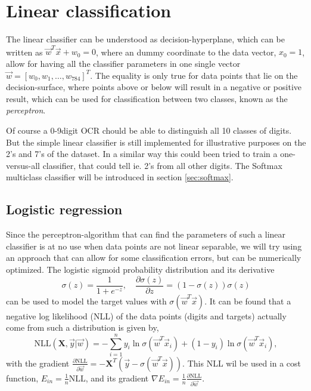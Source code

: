 \documentclass[a4paper,10pt,article,oneside,english]{memoir}
\begin{document}
\chapter{Linear classification}
The linear classifier can be understood as decision-hyperplane, which can be written as $\vec{w}^T \vec{x} + w_0= 0$, where an dummy coordinate to the data vector, $x_0=1$, allow for having all the classifier parameters in one single vector $\vec{w} = [w_0, w_1, \dots, w_{784}]^T$. The equality is only true for data points that lie on the decision-surface, where points above or below will result in a negative or positive result, which can be used for classification between two classes, known as the \emph{perceptron}. 

Of course a 0-9digit OCR chould be able to distinguish all 10 classes of digits. But the simple linear classifier is still implemented for illustrative purposes on the 2's and 7's of the dataset. In a similar way this could been tried to train a one-versus-all classifier, that could tell ie. 2's from all other digits. The Softmax multiclass classifier will be introduced in section \ref{sec:softmax}.
\section{Logistic regression}
Since the perceptron-algorithm that can find the parameters of such a linear classifier is at no use when data points are not linear separable, we will try using an approach that can allow for some classification errors, but can be numerically optimized. The logistic sigmoid probability distribution and its derivative 
\begin{equation*}
\sigma(z) = \frac{1}{1+ e^{-z}}, \quad \frac{\partial \sigma(z)}{\partial z} = (1 - \sigma(z))\sigma(z)
\end{equation*}
can be used to model the target values with $\sigma(\vec{w}^T \vec{x})$. It can be found that a negative log likelihood (NLL) of the data points (digits and targets) actually come from such a distribution is given by,
\begin{equation*}
\text{NLL}(\mathbf{X},\vec{y}|\vec{w}) = - \sum_{i=1}^n y_i \ln\sigma(\vec{w}^T \vec{x}_i) + (1 - y_i)\ln\sigma(\vec{w}^T \vec{x}_i),
\end{equation*}
with the gradient 
$\frac{\partial \text{NLL}}{\partial \vec{w}}= - \mathbf{X}^T(\vec{y} - \sigma(\vec{w}^T \vec{x}))$. This NLL wil be used in a cost function, $E_{in} = \frac{1}{n}\text{NLL}$, and its gradient $\nabla E_{in} = \frac{1}{n}\frac{\partial \text{NLL}}{\partial \vec{w}}$. 
\end{document}
